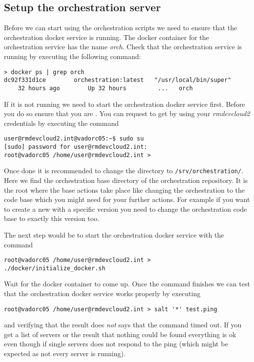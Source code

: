 		\subsection{Setup the orchestration server}
             Before we can start using the orchestration scripts we need to ensure that the orchestration docker service is running. The docker container for the orchestration service has the name \emph{orch}. Check that the orchestration service is running by executing the following command:
         	\begin{verbatim}
> docker ps | grep orch
dc92f331d1ce        orchestration:latest   "/usr/local/bin/super"   
    32 hours ago        Up 32 hours         ...   orch
           	\end{verbatim}
           If it is not running we need to start the orchestration docker service first. Before you do so ensure that you are \rootuser{}. You can request to get \rootuser{} by using your \emph{rmdevcloud2} credentials by executing the command
             \begin{verbatim}
user@rmdevcloud2.int@vadorc05:~$ sudo su
[sudo] password for user@rmdevcloud2.int:
root@vadorc05 /home/user@rmdevcloud2.int >
           \end{verbatim}
           Once done it is recommended to change the directory to \texttt{/srv/orchestration/}. Here we find the orchestration base directory of the orchestration repository. It is the root where the base actions take place like changing the orchestration to the code base which you might need for your further actions. For example if you want to create a new \pod{} with a specific version you need to change the orchestration code base to exactly this version too.
           
           The next step would be to start the orchestration docker service with the command
           \begin{verbatim}
root@vadorc05 /home/user@rmdevcloud2.int > ./docker/initialize_docker.sh
           \end{verbatim}
           Wait for the docker container to come up. Once the command finishes we can test that the orchestration docker service works properly by executing
           \begin{verbatim}
root@vadorc05 /home/user@rmdevcloud2.int > salt '*' test.ping
           \end{verbatim}
           and verifying that the result does \emph{not} says that the command timed out. If you get a list of servers or the result that nothing could be found everything is ok even though if single servers does not respond to the ping (which might be expected as not every server is running).

